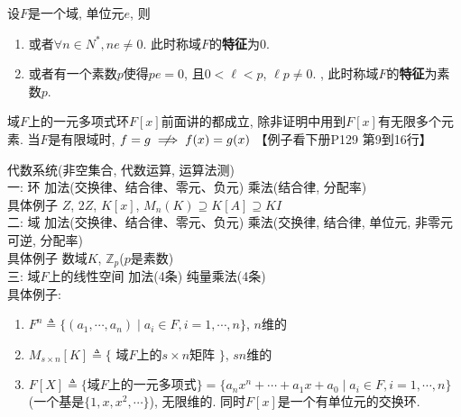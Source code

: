 \begin{Theorem}
设$F$是一个域, 单位元$e$, 则
\begin{enumerate}[(1)]
\item 或者$\forall n \in N^*, ne \neq 0$. 此时称域$F$的\textbf{特征}为$0$.
\item 或者有一个素数$p$使得$pe = 0$, 且$0 < \ell < p$, $\ell p \neq 0$. , 此时称域$F$的\textbf{特征}为素数$p$.
\end{enumerate}
\end{Theorem}

\begin{Note}
域$F$上的一元多项式环$F[x]$前面讲的都成立, 除非证明中用到$F[x]$有无限多个元素. 
当$F$是有限域时, $f = g \centernot\implies f(x) = g(x)$ 【例子看下册P129 第9到16行】
\end{Note}

代数系统(非空集合, 代数运算, 运算法测) \\
一: 环 加法(交换律、结合律、零元、负元) 乘法(结合律, 分配率) \\
具体例子 $Z$, $2Z$, $K[x]$, $M_n(K) \supseteq K[A] \supseteq KI$ \\
二: 域 加法(交换律、结合律、零元、负元) 乘法(交换律, 结合律, 单位元, 非零元可逆, 分配率) \\
具体例子 数域$K$, $\mathbb{Z}_p$($p$是素数) \\
三: 域$F$上的线性空间 加法(4条) 纯量乘法(4条) \\
具体例子: 
\begin{enumerate}
\item $F^n \triangleq \{ (a_1, \cdots, a_n) \mid a_i \in F, i = 1, \cdots, n \}$, $n$维的
\item $M_{s\times n}[K] \triangleq \{$ 域$F$上的$s \times n$矩阵 $\}$, $sn$维的
\item $F[X] \triangleq \{ \text{域$F$上的一元多项式}\} = \{ a_n x^n + \cdots +a_1 x +a_0 \mid a_i \in F, i = 1, \cdots, n \}$ (一个基是$\{ 1, x, x^2, \cdots \}$), 无限维的. 同时$F[x]$是一个有单位元的交换环.
\end{enumerate}

